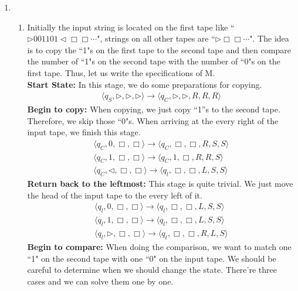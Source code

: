 \documentclass[12pt,a4paper]{article}
\makeatletter
\newtheorem*{solution}{Solution}
\theoremstyle{definition}
\renewenvironment{solution}[1][Solution] {\par\pushQED{\qed}\normalfont\topsep6\p@\@plus6\p@\relax\trivlist\item[\hskip\labelsep\bfseries#1\@addpunct{.}]\ignorespaces}{\popQED\endtrivlist\@endpefalse} \makeatother
\makeatother
\begin{document}
\begin{enumerate}
	\begin{solution}
	~
	\begin{enumerate}
	    \item
	    Initially the input string is located on the first tape like ``$\triangleright001101\triangleleft\Box\Box\cdots$", strings on all other tapes are  ``$\triangleright\Box\Box\cdots$". The idea is to copy the ``1"s on the first tape to the second tape and then compare the number of ``1"s on the second tape with the number of ``0"s on the first tape. Thus, let us write the specifications of M.\\
	    \textbf{Start State:} In this stage, we do some preparations for copying.
	    \begin{align*}
	        \langle q_S, \triangleright, \triangleright, \triangleright \rangle \rightarrow \langle q_C, \triangleright,\triangleright,  R, R, R \rangle
	    \end{align*}
	    \textbf{Begin to copy:} When copying, we just copy ``1''s to the second tape. Therefore, we skip those ``0"s. When arriving at the every right of the input tape, we finish this stage.
	    \begin{align*}
	        \langle q_C, 0, \Box, \Box \rangle \rightarrow \langle q_C, \Box,\Box,  R, S , S \rangle\\
	        \langle q_C, 1, \Box, \Box \rangle \rightarrow \langle q_C, 1,\Box,  R, R , S \rangle\\
	        \langle q_C, \triangleleft, \Box, \Box \rangle \rightarrow \langle q_l, \Box,\Box,  L, S , S \rangle
	    \end{align*}
	    \textbf{Return back to the leftmost:} This stage is quite trivial. We just move the head of the input tape to the every left of it.
	    \begin{align*}
	        \langle q_l, 0, \Box, \Box \rangle \rightarrow \langle q_l, \Box,\Box,  L, S , S \rangle\\
	        \langle q_l, 1, \Box, \Box \rangle \rightarrow \langle q_l, \Box,\Box,  L, S , S \rangle\\
	        \langle q_l, \triangleright, \Box, \Box \rangle \rightarrow \langle q_t, \Box,\Box,  R, L , S \rangle
	    \end{align*}
	    \textbf{Begin to compare:} When doing the comparison, we want to match one ``1" on the second tape with one ``0" on the input tape. We should be careful to determine when we should change the state. There're three cases and we can solve them one by one.
	    \begin{align*}

\end{align*}
\end{enumerate}
\end{solution}
\end{enumerate}
\end{document}
